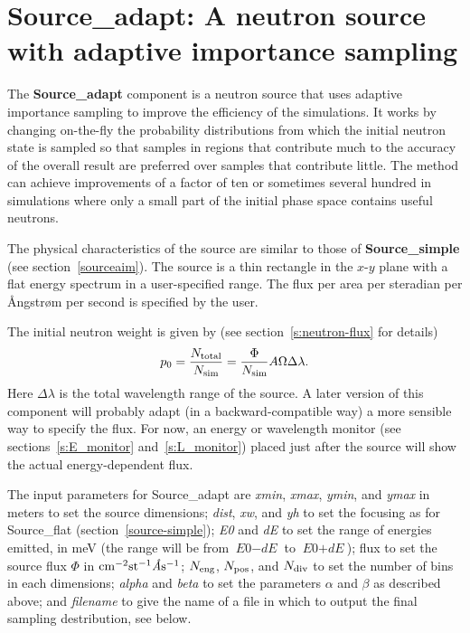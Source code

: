 \section{Source\_adapt: A neutron source with adaptive importance sampling}
\label{s:Source_adapt}
\label{s:source-adapt}


The {\bf Source\_adapt} component is a neutron source that uses adaptive
importance sampling to improve the efficiency of the simulations. It
works by changing on-the-fly the probability distributions from which
the initial neutron state is sampled so that samples in regions that
contribute much to the accuracy of the overall result are preferred over
samples that contribute little. The method can achieve improvements of a
factor of ten or sometimes several hundred in simulations where only a
small part of the initial phase space contains useful neutrons.

The physical characteristics of the source are similar to those of
{\bf Source\_simple} (see section~\ref{sourceaim}). The source is a thin
rectangle in the $x$-$y$ plane with a flat energy spectrum in a
user-specified range. The flux per area per steradian per
{\AA}ngstr{\o}m per second is specified by the user.

The initial neutron weight is given by 
(see section~\ref{s:neutron-flux} for details)
\begin{equation} 
    p_0 = \frac{N_{\rm total}}{N_{\rm sim}} =
    \frac{\Phi}{N_{\rm sim}} A \Omega \Delta\lambda . 
\end{equation}
Here $\Delta\lambda$ is the total wavelength range of the source.
A later version of
this component will probably adapt (in a backward-compatible way) a more
sensible way to specify the flux. For now, an energy or wavelength
monitor (see sections~\ref{s:E_monitor} and~\ref{s:L_monitor}) placed
just after the source will show the actual energy-dependent flux.

The input parameters for Source\_adapt are
\textit{xmin}, \textit{xmax}, \textit{ymin}, and
\textit{ymax} in meters to set the source dimensions;
\textit{dist}, \textit{xw}, and \textit{yh}
to set the focusing as for Source\_flat (section~\ref{source-simple}); 
\textit{E0} and \textit{dE} to set the range of energies emitted, in meV (the range
will be from $\textit{E0} - \textit{dE}$ to
$\textit{E0} + \textit{dE}$); 
flux to set the source flux $\Phi$ in ${\rm
  cm}^{-2} {\rm st}^{-1} \textit{\AA} {\rm s}^{-1}$;
$N_{\rm eng}$, $N_{\rm pos}$, and $N_{\rm
  div}$ to set the number of bins in each dimensions; \textit{alpha} and
\textit{beta} to set the parameters $\alpha$ and $\beta$ as described
above; and \textit{filename} to give the name of a file in which to
output the final sampling destribution, see below.


